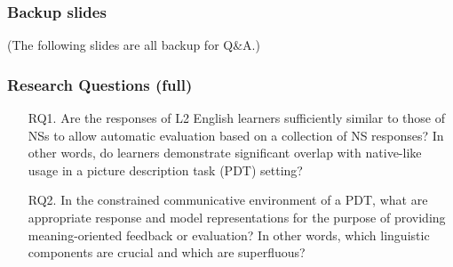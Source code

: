 \documentclass[handout,xcolor={dvipsnames}]{beamer}
\begin{document}


\begin{frame}
\frametitle{Backup slides}
\begin{center}
\large
(The following slides are all backup for Q\&A.)
\end{center}
\end{frame}

\begin{frame}
\frametitle{Research Questions (full)}
\small
\pause
\begin{itemize}
\pause
\vspace{2em}
\item[RQ1.]{Are the responses of L2 English learners sufficiently similar to those of NSs to allow automatic evaluation based on a collection of NS responses? In other words, do learners demonstrate significant overlap with native-like usage in a picture description task (PDT) setting?} %
\vspace{2em}
\pause
\item[RQ2.]{In the constrained communicative environment of a PDT, what are appropriate response and model representations for the purpose of providing meaning-oriented feedback or evaluation? In other words, which linguistic components are crucial and which are superfluous?}


\end{itemize}
\end{frame}
\end{document}
